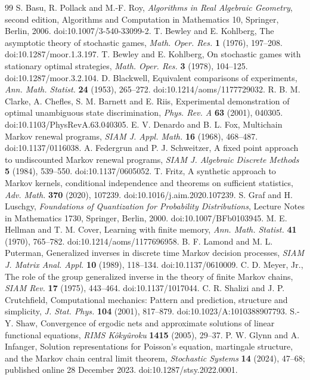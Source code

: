 \begin{thebibliography}{99}
S. Basu, R. Pollack and M.-F. Roy, \emph{Algorithms in Real Algebraic Geometry}, second edition, Algorithms and Computation in Mathematics 10, Springer, Berlin, 2006. doi:10.1007/3-540-33099-2.
T. Bewley and E. Kohlberg, The asymptotic theory of stochastic games, \emph{Math. Oper. Res.} \textbf{1} (1976), 197--208. doi:10.1287/moor.1.3.197.
T. Bewley and E. Kohlberg, On stochastic games with stationary optimal strategies, \emph{Math. Oper. Res.} \textbf{3} (1978), 104--125. doi:10.1287/moor.3.2.104.
D. Blackwell, Equivalent comparisons of experiments, \emph{Ann. Math. Statist.} \textbf{24} (1953), 265--272. doi:10.1214/aoms/1177729032.
R. B. M. Clarke, A. Chefles, S. M. Barnett and E. Riis, Experimental demonstration of optimal unambiguous state discrimination, \emph{Phys. Rev. A} \textbf{63} (2001), 040305. doi:10.1103/PhysRevA.63.040305.
E. V. Denardo and B. L. Fox, Multichain Markov renewal programs, \emph{SIAM J. Appl. Math.} \textbf{16} (1968), 468--487. doi:10.1137/0116038.
A. Federgrun and P. J. Schweitzer, A fixed point approach to undiscounted Markov renewal programs, \emph{SIAM J. Algebraic Discrete Methods} \textbf{5} (1984), 539--550. doi:10.1137/0605052.
T. Fritz, A synthetic approach to Markov kernels, conditional independence and theorems on sufficient statistics, \emph{Adv. Math.} \textbf{370} (2020), 107239. doi:10.1016/j.aim.2020.107239.
S. Graf and H. Luschgy, \emph{Foundations of Quantization for Probability Distributions}, Lecture Notes in Mathematics 1730, Springer, Berlin, 2000. doi:10.1007/BFb0103945.
M. E. Hellman and T. M. Cover, Learning with finite memory, \emph{Ann. Math. Statist.} \textbf{41} (1970), 765--782. doi:10.1214/aoms/1177696958.
B. F. Lamond and M. L. Puterman, Generalized inverses in discrete time Markov decision processes, \emph{SIAM J. Matrix Anal. Appl.} \textbf{10} (1989), 118--134. doi:10.1137/0610009.
C. D. Meyer, Jr., The role of the group generalized inverse in the theory of finite Markov chains, \emph{SIAM Rev.} \textbf{17} (1975), 443--464. doi:10.1137/1017044.
C. R. Shalizi and J. P. Crutchfield, Computational mechanics: Pattern and prediction, structure and simplicity, \emph{J. Stat. Phys.} \textbf{104} (2001), 817--879. doi:10.1023/A:1010388907793.
S.-Y. Shaw, Convergence of ergodic nets and approximate solutions of linear functional equations, \emph{RIMS K\^oky\^uroku} \textbf{1415} (2005), 29--37.
P. W. Glynn and A. Infanger, Solution representations for Poisson's equation, martingale structure, and the Markov chain central limit theorem, \emph{Stochastic Systems} \textbf{14} (2024), 47--68; published online 28 December 2023. doi:10.1287/stsy.2022.0001.
\end{thebibliography}

